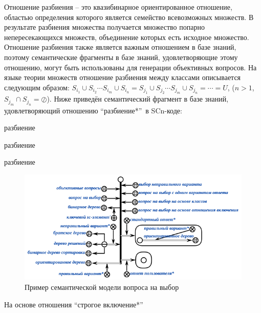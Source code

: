 \begin{textitemize}
\begin{textitemize}
		Отношение разбиения – это квазибинарное ориентированное отношение, областью определения которого является семейство всевозможных множеств. В  результате разбиения множества получается множество попарно непересекающихся множеств, объединение которых есть исходное множество. Отношение разбиения также является важным отношением в базе знаний, поэтому семантические фрагменты в базе знаний, удовлетворяющие этому отношению, могут быть использованы для генерации объективных вопросов. На языке теории множеств отношение разбиения между классами описывается следующим образом: $S_{i_{1}}\cup  S_{i_{2}}\cdots S_{i_{m}} \cup S_{i_{n}} = S_{j_{1}}\cup  S_{j_{2}}\cdots S_{j_{m}} \cup S_{j_{n}}= \cdots = U$, ($n>1$, $S_{j_{m}} \cap S_{j_{n}} = \oslash$). Ниже приведён семантический фрагмент в базе знаний, удовлетворяющий отношению ``разбиение*''\ в SCn-коде:
		
		\begin{scnrelfromset}{разбиение}
		\end{scnrelfromset}
		\begin{scnrelfromset}{разбиение}
		\end{scnrelfromset}
		\begin{scnrelfromset}{разбиение}
		\end{scnrelfromset}
		
		\begin{figure}[H]
			\includegraphics[scale=1]{author/part7/figures/MC_question_example.png}
			\caption{Пример семантической модели вопроса на выбор}
			\label{fig:mc_example}
		\end{figure}
		
		\item На основе отношения ``строгое включение*''
		

\end{textitemize}
\end{textitemize}
